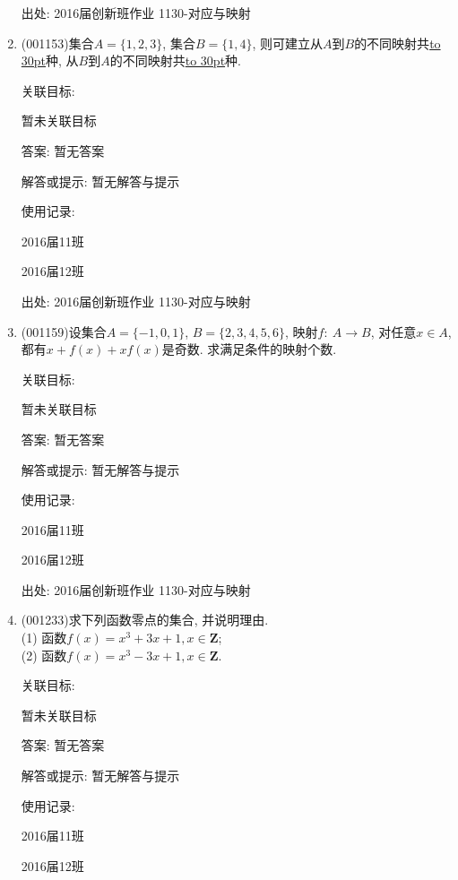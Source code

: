\documentclass[10pt,a4paper]{article}
\newcommand{\blank}[1]{\underline{\hbox to #1pt{}}}
\begin{document}
\begin{enumerate}[1.]
出处: 2016届创新班作业	1130-对应与映射
\item { (001153)}集合$A=\{1,2,3\}$, 集合$B=\{1,4\}$, 则可建立从$A$到$B$的不同映射共\blank{30}种, 从$B$到$A$的不同映射共\blank{30}种.


关联目标:

暂未关联目标

答案: 暂无答案

解答或提示: 暂无解答与提示

使用记录:

2016届11班	

2016届12班	


出处: 2016届创新班作业	1130-对应与映射
\item { (001159)}设集合$A=\{-1, 0, 1\}$, $B=\{2,3,4,5,6\}$, 映射$f:\ A\rightarrow B$, 对任意$x\in A$, 都有$x+f(x)+xf(x)$是奇数. 求满足条件的映射个数.


关联目标:

暂未关联目标

答案: 暂无答案

解答或提示: 暂无解答与提示

使用记录:

2016届11班	

2016届12班	


出处: 2016届创新班作业	1130-对应与映射
\item { (001233)}求下列函数零点的集合, 并说明理由.\\ 
(1) 函数$f(x)=x^3+3x+1,x\in\mathbf{Z}$;\\ 
(2) 函数$f(x)=x^3-3x+1,x\in\mathbf{Z}$.


关联目标:

暂未关联目标

答案: 暂无答案

解答或提示: 暂无解答与提示

使用记录:

2016届11班		

2016届12班		



\end{enumerate}
\end{document}

